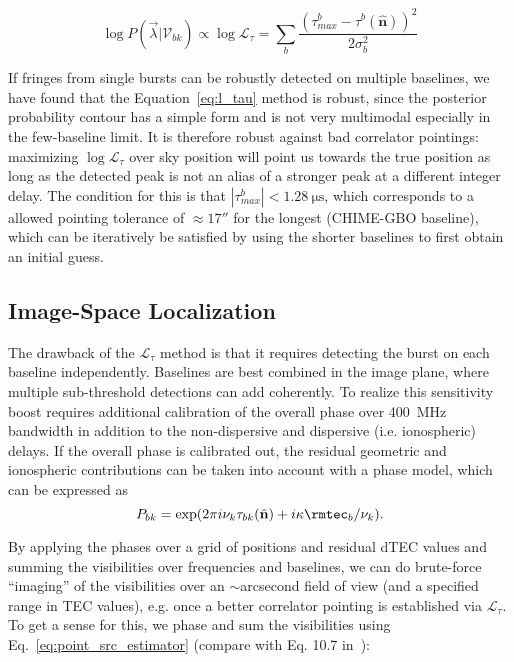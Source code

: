 \begin{equation}
\log P(\vec{\lambda}|\mathcal{V}_{bk}) \propto \log\mathcal{L}_\tau = \sum_b \dfrac{(\tau_{max}^b - \tau^b(\hat{\mathbf{n}}))^2}{2\sigma_b^2} \label{eq:l_tau}
\end{equation}

If fringes from single bursts can be robustly detected on multiple baselines, we have found that the Equation~\ref{eq:l_tau} method is robust, since the posterior probability contour has a simple form and is not very multimodal especially in the few-baseline limit. It is therefore robust against bad correlator pointings: maximizing $\log\mathcal{L}_\tau$ over sky position will point us towards the true position as long as the detected peak is not an alias of a stronger peak at a
different integer delay. The condition for this is that $|\tau_{max}^b| <
\SI{1.28}{\micro\second}$, which corresponds to a allowed pointing tolerance of $\approx 17''$ for the longest (CHIME-GBO baseline), which can be iteratively be satisfied by using the shorter baselines to first obtain an initial guess.

\subsection{Image-Space Localization}\label{sec:fine_loc}
The drawback of the $\mathcal{L}_\tau$ method is that it requires detecting the burst on each baseline independently. Baselines are best combined in the image plane, where multiple sub-threshold detections can add coherently. To realize this sensitivity boost requires additional calibration of the overall phase over \SI{400}{\mega\hertz} bandwidth in addition to the non-dispersive and dispersive (i.e. ionospheric) delays. If the overall phase is calibrated out, the residual geometric and ionospheric contributions can be taken into account with a phase model, which can be expressed as
\begin{equation} 
    P_{bk} = \exp(2\pi i\nu_k \tau_{bk}(\hat{\mathbf{n}}) + i\kappa \rmtec_b / \nu_k).\label{eq:phase_model}
\end{equation}

By applying the phases over a grid of positions and residual dTEC values and summing the visibilities over frequencies and baselines, we can do brute-force ``imaging'' of the visibilities over an $\sim$arcsecond field of view (and a specified range in TEC values), e.g. once a better correlator pointing is established via $\mathcal{L}_\tau$. To get a sense for this, we phase and sum the visibilities using Eq.~\ref{eq:point_src_estimator} (compare with Eq. 10.7 in~\citet{thompson2017interferometry1}): 

